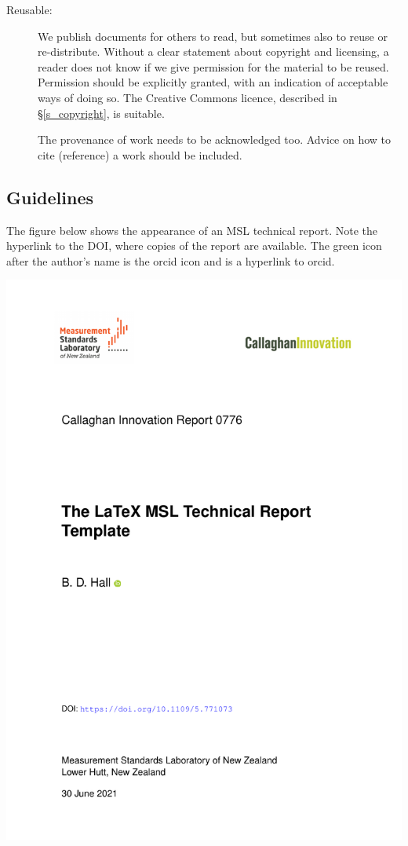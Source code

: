 {\begin{description}
	\item[Reusable: ] We publish documents for others to read, but sometimes also to reuse or re-distribute. Without a clear statement about copyright and licensing, a reader does not know if we give permission for the material to be reused. Permission should be explicitly granted, with an indication of acceptable ways of doing so. The Creative Commons licence, described in \S\ref{s_copyright}, is suitable. 

The provenance of work needs to be acknowledged too. Advice on how to cite (reference) a work should be included. 

\end{description}  

\subsection{Guidelines}
The figure below shows the appearance of an MSL technical report. Note the hyperlink to the DOI, where copies of the report are available. The green icon after the author's name is the orcid icon and is a hyperlink to orcid.

\begin{center}
\includegraphics[scale=.5,page=1]{pictures/Report}
\end{center}

}
